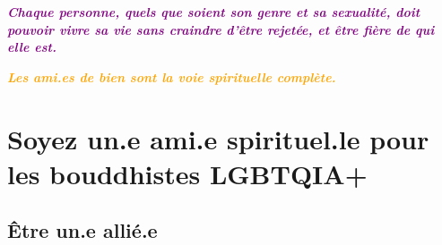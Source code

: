 \documentclass[12pt,openany]{book}
\renewenvironment{quote}{%
  \list{}{%
    \leftmargin-0.1cm   %
    \rightmargin\leftmargin
  }
  \item\relax
}
{\endlist}
\begin{document}
\begin{quote}
\centering
\doublespacing
\textit{\Large \textbf{\textcolor{purple}{Chaque personne, quels que soient son genre et sa sexualité, doit pouvoir vivre sa vie sans craindre d’être rejetée, et être fière de qui elle est.}}}
\end{quote}
\endgroup

\newpage
\thispagestyle{empty}

\begin{figure}[h]
    \centering
\end{figure}

\bigskip

\begin{quote}
\centering
\doublespacing
\textit{\Large \textcolor{orange}{\textbf{Les ami.es de bien sont la voie spirituelle complète.}}}
\end{quote}

\chapter*{Soyez un.e ami.e spirituel.le pour les bouddhistes \mbox{LGBTQIA+}}

\section*{Être un.e allié.e}
\end{document}
